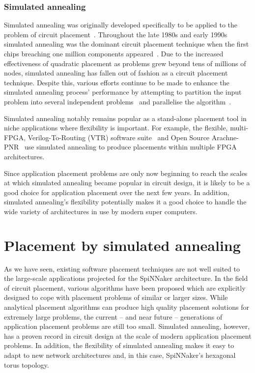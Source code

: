 			
			\subsubsection{Simulated annealing}
				
				Simulated annealing was originally developed specifically to be applied
				to the problem of circuit placement~\cite{kirkpatrick83}. Throughout
				the late 1980s and early 1990s simulated annealing was the dominant
				circuit placement technique when the first chips breaching one million
				components appeared~\cite{betz97,sechen85}. Due to the increased
				effectiveness of quadratic placement as problems grew beyond tens of
				millions of nodes, simulated annealing has fallen out of fashion as a
				circuit placement technique. Despite this, various efforts continue to
				be made to enhance the simulated annealing process' performance by
				attempting to partition the input problem into several independent
				problems~\cite{choong10,haldar00} and parallelise the
				algorithm~\cite{ludwin08}.
				
				Simulated annealing notably remains popular as a stand-alone placement
				tool in niche applications where flexibility is important. For example,
				the flexible, multi-FPGA, Verilog-To-Routing (VTR) software
				suite~\cite{luu14} and Open Source Arachne-PNR~\cite{cseed} use
				simulated annealing to produce placements within multiple FPGA
				architectures.
				
				Since application placement problems are only now beginning to reach
				the scales at which simulated annealing became popular in circuit
				design, it is likely to be a good choice for application placement over
				the next few years. In addition, simulated annealing's flexibility
				potentially makes it a good choice to handle the wide variety of
				architectures in use by modern super computers.
	
	\section{Placement by simulated annealing}
		
		\label{sec:placement-by-annealing}	
		
		As we have seen, existing software placement techniques are not well suited
		to the large-scale applications projected for the SpiNNaker architecture.
		In the field of circuit placement, various algorithms have been proposed
		which are explicitly designed to cope with placement problems of similar or
		larger sizes. While analytical placement algorithms can produce high
		quality placement solutions for extremely large problems, the current --
		and near future -- generations of application placement problems are still
		too small. Simulated annealing, however, has a proven record in circuit
		design at the scale of modern application placement problems. In addition,
		the flexibility of simulated annealing makes it easy to adapt to new
		network architectures and, in this case, SpiNNaker's hexagonal torus
		topology.
		
